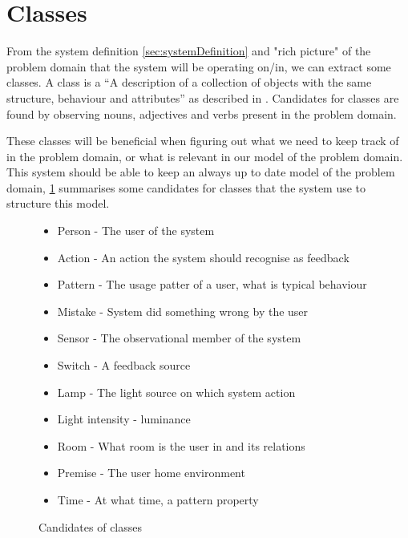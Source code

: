 \section{Classes}

From the system definition \cref{sec:systemDefinition} and "rich picture" of the problem domain that the system will be operating on/in, we can extract some classes. A class is a \enquote{A description of a collection of objects with the same structure, behaviour and attributes} as described in \cite{OOAD}. Candidates for classes are found by observing nouns, adjectives and verbs present in the problem domain.

These classes will be beneficial when figuring out what we need to keep track of in the problem domain, or what is relevant in our model of the problem domain. This system should be able to keep an always up to date model of the problem domain, \cref{lis:classes} summarises some candidates for classes that the system use to structure this model.

\begin{figure}
  \label{lis:classes}
  \begin{itemize}
    \item Person - The user of the system
    \item Action - An action the system should recognise as feedback
    \item Pattern - The usage patter of a user, what is typical behaviour
    \item Mistake - System did something wrong by the user
    \item Sensor - The observational member of the system
    \item Switch - A feedback source
    \item Lamp - The light source on which system action
    \item Light intensity - luminance
    \item Room - What room is the user in and its relations
    \item Premise - The user home environment
    \item Time - At what time, a pattern property
  \end{itemize}
  \caption{Candidates of classes}
\end{figure}
